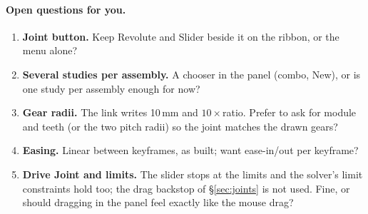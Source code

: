 \paragraph{Open questions for you.}
\begin{enumerate}[nosep]
  \item \textbf{Joint button.} Keep Revolute and Slider beside it on the ribbon, or the menu alone?
  \item \textbf{Several studies per assembly.} A chooser in the panel (combo, New), or is one study per
        assembly enough for now?
  \item \textbf{Gear radii.} The link writes 10\,mm and $10\times$ratio. Prefer to ask for module and
        teeth (or the two pitch radii) so the joint matches the drawn gears?
  \item \textbf{Easing.} Linear between keyframes, as built; want ease-in/out per keyframe?
  \item \textbf{Drive Joint and limits.} The slider stops at the limits and the solver's limit constraints
        hold too; the drag backstop of \S\ref{sec:joints} is not used. Fine, or should dragging in the
        panel feel exactly like the mouse drag?
\end{enumerate}
